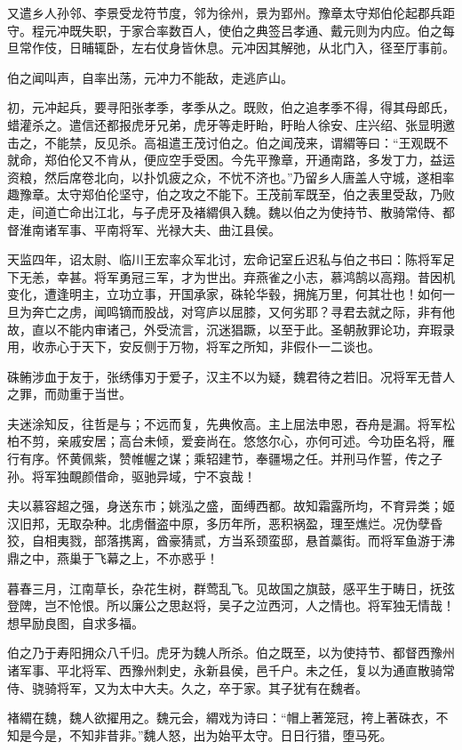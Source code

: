 \documentclass[12pt,UTF8]{ctexbook}
\begin{document}
又遣乡人孙邻、李景受龙符节度，邻为徐州，景为郢州。豫章太守郑伯伦起郡兵距守。程元冲既失职，于家合率数百人，使伯之典签吕孝通、戴元则为内应。伯之每旦常作伎，日晡辄卧，左右仗身皆休息。元冲因其解弛，从北门入，径至厅事前。

伯之闻叫声，自率出荡，元冲力不能敌，走逃庐山。

初，元冲起兵，要寻阳张孝季，孝季从之。既败，伯之追孝季不得，得其母郎氏，蜡灌杀之。遣信还都报虎牙兄弟，虎牙等走盱眙，盱眙人徐安、庄兴绍、张显明邀击之，不能禁，反见杀。高祖遣王茂讨伯之。伯之闻茂来，谓緭等曰：“王观既不就命，郑伯伦又不肯从，便应空手受困。今先平豫章，开通南路，多发丁力，益运资粮，然后席卷北向，以扑饥疲之众，不忧不济也。”乃留乡人唐盖人守城，遂相率趣豫章。太守郑伯伦坚守，伯之攻之不能下。王茂前军既至，伯之表里受敌，乃败走，间道亡命出江北，与子虎牙及褚緭俱入魏。魏以伯之为使持节、散骑常侍、都督淮南诸军事、平南将军、光禄大夫、曲江县侯。

天监四年，诏太尉、临川王宏率众军北讨，宏命记室丘迟私与伯之书曰：陈将军足下无恙，幸甚。将军勇冠三军，才为世出。弃燕雀之小志，慕鸿鹄以高翔。昔因机变化，遭逢明主，立功立事，开国承家，硃轮华毂，拥旄万里，何其壮也！如何一旦为奔亡之虏，闻鸣镝而股战，对穹庐以屈膝，又何劣耶？寻君去就之际，非有他故，直以不能内审诸己，外受流言，沉迷猖蹶，以至于此。圣朝赦罪论功，弃瑕录用，收赤心于天下，安反侧于万物，将军之所知，非假仆一二谈也。

硃鲔涉血于友于，张绣倳刃于爱子，汉主不以为疑，魏君待之若旧。况将军无昔人之罪，而勋重于当世。

夫迷涂知反，往哲是与；不远而复，先典攸高。主上屈法申恩，吞舟是漏。将军松柏不剪，亲戚安居；高台未倾，爱妾尚在。悠悠尔心，亦何可述。今功臣名将，雁行有序。怀黄佩紫，赞帷幄之谋；乘轺建节，奉疆埸之任。并刑马作誓，传之子孙。将军独靦颜借命，驱驰异域，宁不哀哉！

夫以慕容超之强，身送东市；姚泓之盛，面缚西都。故知霜露所均，不育异类；姬汉旧邦，无取杂种。北虏僭盗中原，多历年所，恶积祸盈，理至燋烂。况伪孽昏狡，自相夷戮，部落携离，酋豪猜贰，方当系颈蛮邸，悬首藁街。而将军鱼游于沸鼎之中，燕巢于飞幕之上，不亦惑乎！

暮春三月，江南草长，杂花生树，群莺乱飞。见故国之旗鼓，感平生于畴日，抚弦登陴，岂不怆恨。所以廉公之思赵将，吴子之泣西河，人之情也。将军独无情哉！想早励良图，自求多福。

伯之乃于寿阳拥众八千归。虎牙为魏人所杀。伯之既至，以为使持节、都督西豫州诸军事、平北将军、西豫州刺史，永新县侯，邑千户。未之任，复以为通直散骑常侍、骁骑将军，又为太中大夫。久之，卒于家。其子犹有在魏者。

褚緭在魏，魏人欲擢用之。魏元会，緭戏为诗曰：“帽上著笼冠，袴上著硃衣，不知是今是，不知非昔非。”魏人怒，出为始平太守。日日行猎，堕马死。
\end{document}
